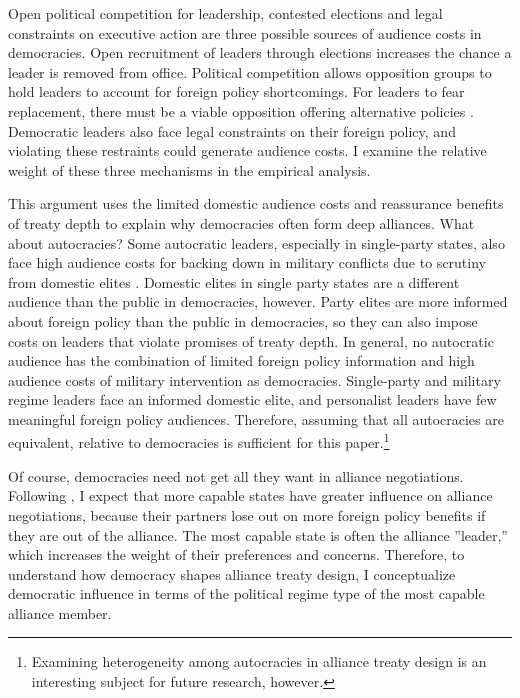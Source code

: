 \documentclass[12pt]{article}
\begin{document}
Open political competition for leadership, contested elections and legal constraints on executive action are three possible sources of audience costs in democracies. 
Open recruitment of leaders through elections increases the chance a leader is removed from office. 
Political competition allows opposition groups to hold leaders to account for foreign policy shortcomings. 
For leaders to fear replacement, there must be a viable opposition offering alternative policies \citep{PotterBaum2014}.
Democratic leaders also face legal constraints on their foreign policy, and violating these restraints could generate audience costs. 
I examine the relative weight of these three mechanisms in the empirical analysis.  


This argument uses the limited domestic audience costs and reassurance benefits of treaty depth to explain why democracies often form deep alliances. 
What about autocracies? 
Some autocratic leaders, especially in single-party states, also face high audience costs for backing down in military conflicts due to scrutiny from domestic elites \citep{Weeks2014}.
Domestic elites in single party states are a different audience than the public in democracies, however.  
Party elites are more informed about foreign policy than the public in democracies, so they can also impose costs on leaders that violate promises of treaty depth. 
In general, no autocratic audience has the combination of limited foreign policy information and high audience costs of military intervention as democracies.
Single-party and military regime leaders face an informed domestic elite, and personalist leaders have few meaningful foreign policy audiences. 
Therefore, assuming that all autocracies are equivalent, relative to democracies is sufficient for this paper.\footnote{Examining heterogeneity among autocracies in alliance treaty design is an interesting subject for future research, however.} 


Of course, democracies need not get all they want in alliance negotiations. 
Following \citep{Mattes2012}, I expect that more capable states have greater influence on alliance negotiations, because their partners lose out on more foreign policy benefits if they are out of the alliance.
The most capable state is often the alliance ''leader,'' which increases the weight of their preferences and concerns. 
Therefore, to understand how democracy shapes alliance treaty design, I conceptualize democratic influence in terms of the political regime type of the most capable alliance member. 
\end{document}
